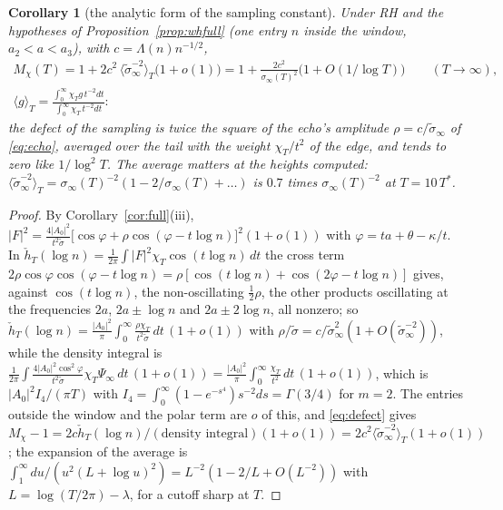 \documentclass[11pt]{article}
\newtheorem{corollary}[theorem]{Corollary}
\theoremstyle{definition}
\theoremstyle{remark}
\newcommand{\Tst}{T^{*}}
\begin{document}
\begin{corollary}[the analytic form of the sampling constant]\label{cor:M}
Under RH and the hypotheses of Proposition~\ref{prop:whfull} (one entry $n$ inside the window, $a_2<a<a_3$), with $c=\Lambda(n)n^{-1/2}$,
\begin{gather*}
M_\chi(T)=1+2c^2\,\big\langle\tilde\sigma_\infty^{-2}\big\rangle_T\big(1+o(1)\big)=1+\frac{2c^2}{\sigma_\infty(T)^2}\big(1+O(1/\log T)\big)\qquad(T\to\infty),\\
\langle g\rangle_T=\frac{\int_0^\infty\chi_Tg\,t^{-2}dt}{\int_0^\infty\chi_T\,t^{-2}dt} :
\end{gather*}
the defect of the sampling is twice the square of the echo's amplitude $\rho=c/\tilde\sigma_\infty$ of \eqref{eq:echo}, averaged over the tail with the weight $\chi_T/t^2$ of the edge, and tends to zero like $1/\log^2T$. The average matters at the heights computed: $\langle\tilde\sigma_\infty^{-2}\rangle_T=\sigma_\infty(T)^{-2}(1-2/\sigma_\infty(T)+\dots)$ is $0.7$ times $\sigma_\infty(T)^{-2}$ at $T=10\,\Tst$.
\end{corollary}
\begin{proof}
By Corollary~\ref{cor:full}(iii), $|F|^2=\frac{4|A_0|^2}{t^2\tilde\sigma}\big[\cos\varphi+\rho\cos(\varphi-t\log n)\big]^2(1+o(1))$ with $\varphi=ta+\theta-\kappa/t$. In $\check h_T(\log n)=\frac1{2\pi}\int|F|^2\chi_T\cos(t\log n)\,dt$ the cross term $2\rho\cos\varphi\cos(\varphi-t\log n)=\rho[\cos(t\log n)+\cos(2\varphi-t\log n)]$ gives, against $\cos(t\log n)$, the non-oscillating $\tfrac12\rho$, the other products oscillating at the frequencies $2a$, $2a\pm\log n$ and $2a\pm2\log n$, all nonzero; so $\check h_T(\log n)=\frac{|A_0|^2}{\pi}\int_0^\infty\frac{\rho\chi_T}{t^2\tilde\sigma}\,dt\,(1+o(1))$ with $\rho/\tilde\sigma=c/\tilde\sigma_\infty^2(1+O(\tilde\sigma_\infty^{-2}))$, while the density integral is $\frac1{2\pi}\int\frac{4|A_0|^2\cos^2\varphi}{t^2\tilde\sigma}\chi_T\Psi_\infty\,dt\,(1+o(1))=\frac{|A_0|^2}{\pi}\int_0^\infty\frac{\chi_T}{t^2}\,dt\,(1+o(1))$, which is $|A_0|^2I_4/(\pi T)$ with $I_4=\int_0^\infty(1-e^{-s^4})s^{-2}ds=\Gamma(3/4)$ for $m=2$. The entries outside the window and the polar term are $o$ of this, and \eqref{eq:defect} gives $M_\chi-1=2c\check h_T(\log n)/(\text{density integral})(1+o(1))=2c^2\langle\tilde\sigma_\infty^{-2}\rangle_T(1+o(1))$; the expansion of the average is $\int_1^\infty du/(u^2(L+\log u)^2)=L^{-2}(1-2/L+O(L^{-2}))$ with $L=\log(T/2\pi)-\lambda$, for a cutoff sharp at $T$.
\end{proof}
\end{document}
